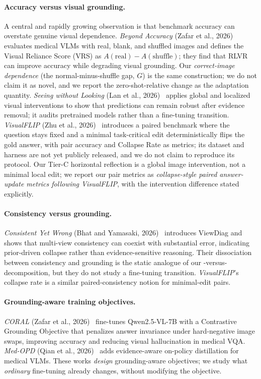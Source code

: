 \paragraph{Accuracy versus visual grounding.}
A central and rapidly growing observation is that benchmark accuracy can
overstate genuine visual dependence. \emph{Beyond Accuracy}
(Zafar et al., 2026)~\cite{zafar2026beyond} evaluates medical VLMs with
real, blank, and shuffled images and defines the Visual Reliance Score
(VRS) as $A(\text{real}) - A(\text{shuffle})$; they find that RLVR can
improve accuracy while degrading visual grounding. Our \emph{correct-image
dependence} (the normal-minus-shuffle gap, $G$) is the same construction;
we do not claim it as novel, and we report the zero-shot-relative change
\dG{} as the adaptation quantity. \emph{Seeing without Looking}
(Lan et al., 2026)~\cite{lan2026seeing} applies global and localized
visual interventions to show that predictions can remain robust after
evidence removal; it audits pretrained models rather than a fine-tuning
transition. \emph{VisualFLIP} (Zhu et al., 2026)~\cite{zhu2026visualflip}
introduces a paired benchmark where the question stays fixed and a minimal
task-critical edit deterministically flips the gold answer, with pair
accuracy and Collapse Rate as metrics; its dataset and harness are not yet
publicly released, and we do not claim to reproduce its protocol. Our
Tier-C horizontal reflection is a global image intervention, not a minimal
local edit; we report our pair metrics as \emph{collapse-style paired
answer-update metrics following VisualFLIP}, with the intervention
difference stated explicitly.

\paragraph{Consistency versus grounding.}
\emph{Consistent Yet Wrong} (Bhat and Yamasaki, 2026)~\cite{bhat2026consistent}
introduces ViewDiag and shows that multi-view consistency can coexist with
substantial error, indicating prior-driven collapse rather than
evidence-sensitive reasoning. Their dissociation between consistency and
grounding is the static analogue of our \dC{}-versus-\dG{} decomposition,
but they do not study a fine-tuning transition. \emph{VisualFLIP}'s
collapse rate is a similar paired-consistency notion for minimal-edit
pairs.

\paragraph{Grounding-aware training objectives.}
\emph{CORAL} (Zafar et al., 2026)~\cite{zafar2026coral} fine-tunes
Qwen2.5-VL-7B with a Contrastive Grounding Objective that penalizes answer
invariance under hard-negative image swaps, improving accuracy and
reducing visual hallucination in medical VQA. \emph{Med-OPD}
(Qian et al., 2026)~\cite{qian2026medopd} adds evidence-aware on-policy
distillation for medical VLMs. These works \emph{design} grounding-aware
objectives; we study what \emph{ordinary} fine-tuning already changes,
without modifying the objective.


